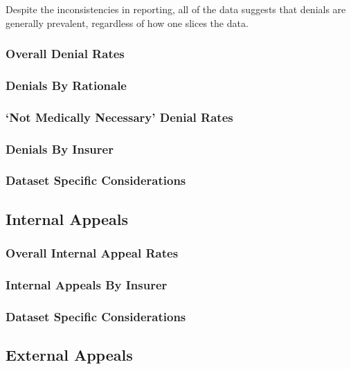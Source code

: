 \documentclass[12pt, a4paper,twoside]{report}
\theoremstyle{plain} %
\theoremstyle{definition} %
\theoremstyle{remark} %
\numberwithin{equation}{chapter}
\begin{document}
		Despite the inconsistencies in reporting, all of the data suggests that denials are generally prevalent, regardless of how one slices the data.
		
		\subsubsection{Overall Denial Rates}
		
		\subsubsection{Denials By Rationale}
		
		\subsubsection{`Not Medically Necessary' Denial Rates}
		
		\subsubsection{Denials By Insurer}
		
		\subsubsection{Dataset Specific Considerations}
		
		
		\subsection{Internal Appeals}\label{publicdata:internalappeals}
		
		
		\subsubsection{Overall Internal Appeal Rates}
		
		\subsubsection{Internal Appeals By Insurer}
		
		\subsubsection{Dataset Specific Considerations}
		
		\subsection{External Appeals}\label{publicdata:externalappeals}
		
\end{document}
